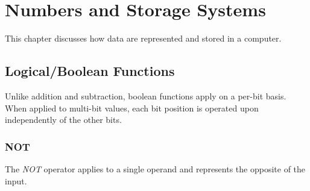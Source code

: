 \chapter{Numbers and Storage Systems}
\label{chapter:numbers}

This chapter discusses how data are represented and stored in a computer.


%

\section{Logical/Boolean Functions}

%
Unlike addition and subtraction, boolean functions apply 
on a per-bit basis.
When applied to multi-bit values, each bit position is operated upon 
independently of the other bits.

\subsection{NOT}

The {\em NOT} operator applies to a single operand and represents the 
opposite of the input.

